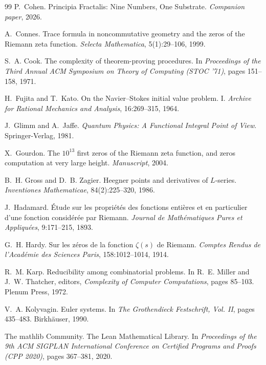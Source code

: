 \documentclass[11pt,a4paper]{amsart}
\theoremstyle{plain}
\theoremstyle{definition}
\begin{document}
\begin{thebibliography}{99}
P.~Cohen.
\newblock Principia Fractalis: Nine Numbers, One Substrate.
\newblock \emph{Companion paper}, 2026.

A.~Connes.
\newblock Trace formula in noncommutative geometry and the zeros of the Riemann zeta function.
\newblock \emph{Selecta Mathematica}, 5(1):29--106, 1999.

S.~A. Cook.
\newblock The complexity of theorem-proving procedures.
\newblock In \emph{Proceedings of the Third Annual ACM Symposium on Theory of Computing (STOC '71)}, pages 151--158, 1971.

H.~Fujita and T.~Kato.
\newblock On the Navier--Stokes initial value problem. I.
\newblock \emph{Archive for Rational Mechanics and Analysis}, 16:269--315, 1964.

J.~Glimm and A.~Jaffe.
\newblock \emph{Quantum Physics: A Functional Integral Point of View}.
\newblock Springer-Verlag, 1981.

X.~Gourdon.
\newblock The $10^{13}$ first zeros of the Riemann zeta function, and zeros computation at very large height.
\newblock \emph{Manuscript}, 2004.

B.~H. Gross and D.~B. Zagier.
\newblock Heegner points and derivatives of $L$-series.
\newblock \emph{Inventiones Mathematicae}, 84(2):225--320, 1986.

J.~Hadamard.
\newblock \'Etude sur les propri\'et\'es des fonctions enti\`eres et en particulier d'une fonction consid\'er\'ee par Riemann.
\newblock \emph{Journal de Math\'ematiques Pures et Appliqu\'ees}, 9:171--215, 1893.

G.~H. Hardy.
\newblock Sur les z\'eros de la fonction $\zeta(s)$ de Riemann.
\newblock \emph{Comptes Rendus de l'Acad\'emie des Sciences Paris}, 158:1012--1014, 1914.

R.~M. Karp.
\newblock Reducibility among combinatorial problems.
\newblock In R.~E. Miller and J.~W. Thatcher, editors, \emph{Complexity of Computer Computations}, pages 85--103. Plenum Press, 1972.

V.~A. Kolyvagin.
\newblock Euler systems.
\newblock In \emph{The Grothendieck Festschrift, Vol. II}, pages 435--483. Birkh\"auser, 1990.

The mathlib Community.
\newblock The Lean Mathematical Library.
\newblock In \emph{Proceedings of the 9th ACM SIGPLAN International Conference on Certified Programs and Proofs (CPP 2020)}, pages 367--381, 2020.


\end{thebibliography}
\end{document}
